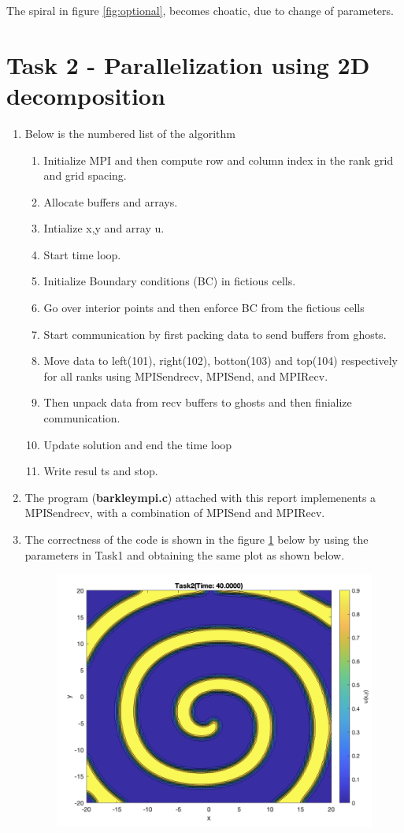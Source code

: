 \documentclass[12pt,a4paper]{article}
\begin{document}
	The spiral in figure \ref{fig:optional}, becomes choatic, due to change of parameters.
	
	\section*{Task 2 - Parallelization using 2D decomposition}	
	
	\begin{enumerate}
		\item Below is the numbered list of the algorithm
		
		\begin{enumerate}
			\item Initialize MPI and then compute row and column index in the rank grid and grid spacing.
			\item Allocate buffers and arrays.
			\item Intialize x,y and array u.
			\item Start time loop.
			\item  Initialize Boundary conditions (BC) in fictious cells.
			\item Go over interior points and then enforce  BC from the fictious cells
			\item  Start communication by first packing data to send buffers from ghosts.
			\item Move data to left(101), right(102), botton(103) and top(104) respectively for all ranks using MPI\textunderscore Sendrecv, MPI\textunderscore Send, and MPI\textunderscore Recv.
			\item Then unpack data from recv buffers to ghosts and then finialize communication.
			\item Update solution and end the time loop
			\item Write resul ts and stop.
		\end{enumerate}
		
		\item The program (\textbf{barkley\textunderscore mpi.c}) attached with this report implemenents a MPI\textunderscore Sendrecv, with a combination of MPI\textunderscore Send and MPI\textunderscore Recv.
		
		\item The correctness of the code is shown in the figure \ref{fig:Task 2} below by using the parameters in Task1 and obtaining the same plot as shown below.
		
		\begin{figure}[h]
			\centering
			\includegraphics[width=0.5\linewidth]{"Screenshot 2021-03-16 at 6.51.17 PM"}
			\caption{}
			\label{fig:Task 2}
		\end{figure}
		

\end{enumerate}
\end{document}
